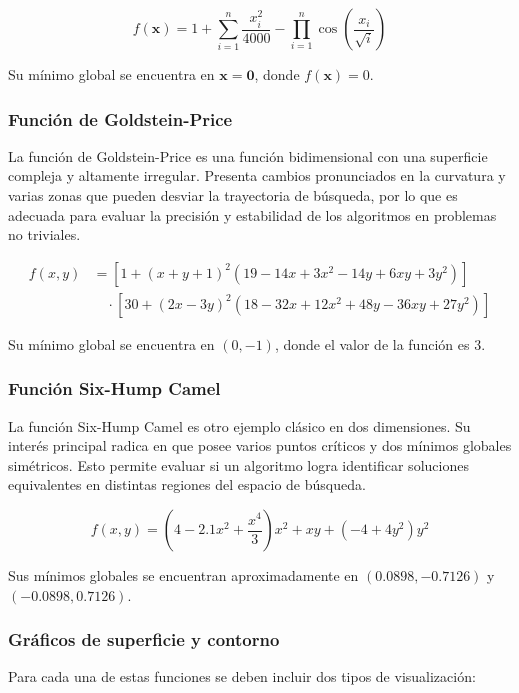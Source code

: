 \documentclass[
  12pt,
  letterpaper,
  DIV=11,
  numbers=noendperiod]{scrartcl}
\begin{document}
\[
f(\mathbf{x}) = 1 + \sum_{i=1}^{n}\frac{x_i^2}{4000} - \prod_{i=1}^{n}\cos\left(\frac{x_i}{\sqrt{i}}\right)
\]

Su mínimo global se encuentra en \(\mathbf{x}=\mathbf{0}\), donde
\(f(\mathbf{x})=0\).

\subsubsection{Función de
Goldstein-Price}\label{funciuxf3n-de-goldstein-price}

La función de Goldstein-Price es una función bidimensional con una
superficie compleja y altamente irregular. Presenta cambios pronunciados
en la curvatura y varias zonas que pueden desviar la trayectoria de
búsqueda, por lo que es adecuada para evaluar la precisión y estabilidad
de los algoritmos en problemas no triviales.

\[
\begin{aligned}
f(x,y) &= \left[1 + (x+y+1)^2(19 - 14x + 3x^2 - 14y + 6xy + 3y^2)\right] \\
&\quad \cdot \left[30 + (2x-3y)^2(18 - 32x + 12x^2 + 48y - 36xy + 27y^2)\right]
\end{aligned}
\]

Su mínimo global se encuentra en \((0,-1)\), donde el valor de la
función es \(3\).

\subsubsection{Función Six-Hump Camel}\label{funciuxf3n-six-hump-camel}

La función Six-Hump Camel es otro ejemplo clásico en dos dimensiones. Su
interés principal radica en que posee varios puntos críticos y dos
mínimos globales simétricos. Esto permite evaluar si un algoritmo logra
identificar soluciones equivalentes en distintas regiones del espacio de
búsqueda.

\[
f(x,y) = \left(4 - 2.1x^2 + \frac{x^4}{3}\right)x^2 + xy + \left(-4 + 4y^2\right)y^2
\]

Sus mínimos globales se encuentran aproximadamente en
\((0.0898,-0.7126)\) y \((-0.0898,0.7126)\).

\subsubsection{Gráficos de superficie y
contorno}\label{gruxe1ficos-de-superficie-y-contorno}

Para cada una de estas funciones se deben incluir dos tipos de
visualización:
\end{document}
